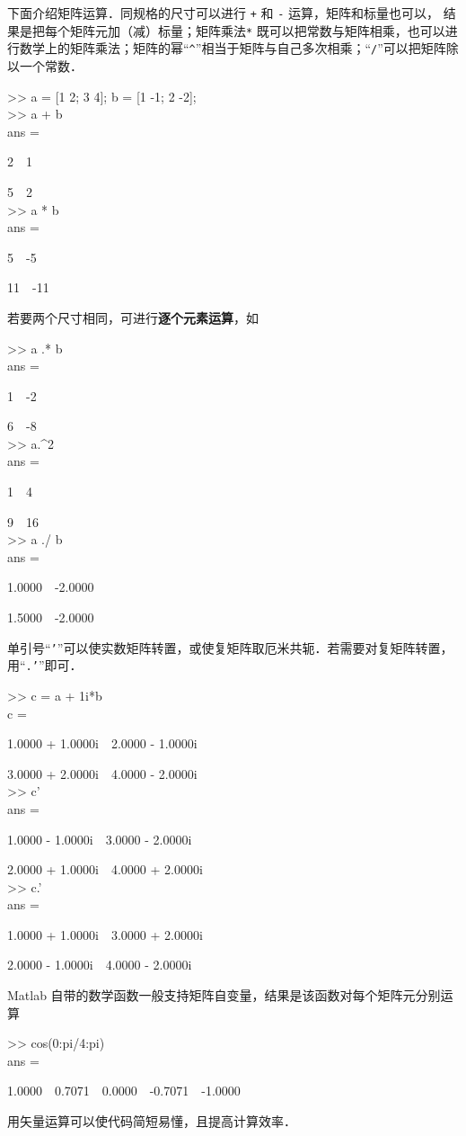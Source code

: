 下面介绍矩阵运算．同规格的尺寸可以进行 \texttt{+} 和 \texttt{-} 运算，矩阵和标量也可以， 结果是把每个矩阵元加（减）标量；矩阵乘法\texttt{*} 既可以把常数与矩阵相乘，也可以进行数学上的矩阵乘法；矩阵的幂“\texttt{\^{}}”相当于矩阵与自己多次相乘；“\texttt{/}”可以把矩阵除以一个常数．
\begin{Command}
>> a = [1 2; 3 4]; b = [1 -1; 2 -2]; \\
>> a + b \\
ans = \par
2\ \ 1 \par
5\ \ 2\\
>> a * b \\
ans = \par
5\ \ -5 \par
11\ \ -11
\end{Command}
若要两个尺寸相同，可进行\textbf{逐个元素运算}，如
\begin{Command}
>> a .* b \\
ans = \par
1\ \ -2 \par
6\ \ -8\\
>> a.\^{}2 \\
ans = \par
1\ \ 4 \par
9\ \ 16 \\
>> a ./ b \\
ans = \par
1.0000\ \ -2.0000 \par
1.5000\ \ -2.0000
\end{Command}
单引号“\texttt{'}”可以使实数矩阵转置，或使复矩阵取厄米共轭．若需要对复矩阵转置，用“\texttt{.'}”即可．
\begin{Command}
>> c = a + 1i*b \\
c = \par
1.0000 + 1.0000i\ \ 2.0000 - 1.0000i \par
3.0000 + 2.0000i\ \ 4.0000 - 2.0000i \\
>> c' \\
ans = \par
1.0000 - 1.0000i\ \ 3.0000 - 2.0000i \par
2.0000 + 1.0000i\ \ 4.0000 + 2.0000i \\
>> c.' \\
ans = \par
1.0000 + 1.0000i\ \ 3.0000 + 2.0000i \par
2.0000 - 1.0000i\ \ 4.0000 - 2.0000i
\end{Command}
Matlab 自带的数学函数一般支持矩阵自变量，结果是该函数对每个矩阵元分别运算
\begin{Command}
>> cos(0:pi/4:pi)\\
ans = \par
1.0000\ \ 0.7071\ \ 0.0000\ \ -0.7071\ \ -1.0000
\end{Command}
用矢量运算可以使代码简短易懂，且提高计算效率．

